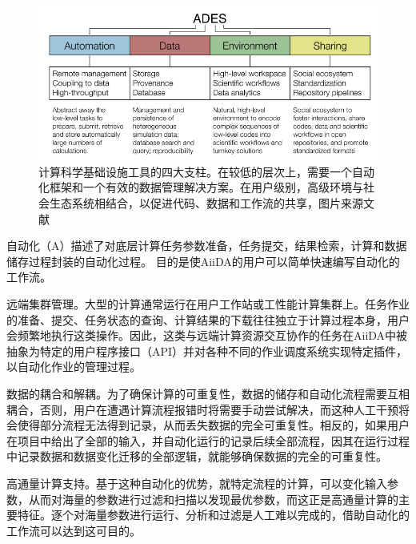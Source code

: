 \begin{figure}
  \includegraphics[width=1.0\textwidth]{figs/ch3_ades.png}
  \centering
  \caption{计算科学基础设施工具的四大支柱。在较低的层次上，需要一个自动化框架和一个有效的数据管理解决方案。在用户级别，高级环境与社会生态系统相结合，以促进代码、数据和工作流的共享，图片来源文献\cite{pizzi2016aiida}}
  \label{fig:ch3_ades}
\end{figure}

自动化（A）描述了对底层计算任务参数准备，任务提交，结果检索，计算和数据储存过程封装的自动化过程。 目的是使AiiDA的用户可以简单快速编写自动化的工作流。
\begin{alphaenum}
    \item 远端集群管理。大型的计算通常运行在用户工作站或工性能计算集群上。任务作业的准备、提交、任务状态的查询、计算结果的下载往往独立于计算过程本身，用户会频繁地执行这类操作。因此，这类与远端计算资源交互协作的任务在AiiDA中被抽象为特定的用户程序接口（API）并对各种不同的作业调度系统实现特定插件，以自动化作业的管理过程。
    \item 数据的耦合和解耦。为了确保计算的可重复性，数据的储存和自动化流程需要互相耦合，否则，用户在遭遇计算流程报错时将需要手动尝试解决，而这种人工干预将会使得部分流程无法得到记录，从而丢失数据的完全可重复性。相反的，如果用户在项目中给出了全部的输入，并自动化运行的记录后续全部流程，因其在运行过程中记录数据和数据变化迁移的全部逻辑，就能够确保数据的完全的可重复性。
    \item 高通量计算支持。基于这种自动化的优势，就特定流程的计算，可以变化输入参数，从而对海量的参数进行过滤和扫描以发现最优参数，而这正是高通量计算的主要特征。逐个对海量参数进行运行、分析和过滤是人工难以完成的，借助自动化的工作流可以达到这可目的。
\end{alphaenum}

